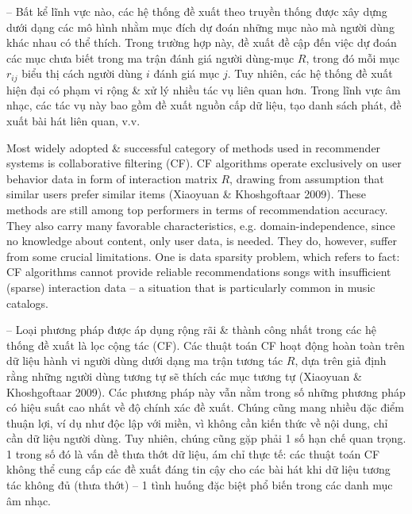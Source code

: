 \documentclass{article}
\begin{document}
\begin{itemize}
    -- Bất kể lĩnh vực nào, các hệ thống đề xuất theo truyền thống được xây dựng dưới dạng các mô hình nhằm mục đích dự đoán những mục nào mà người dùng khác nhau có thể thích. Trong trường hợp này, đề xuất đề cập đến việc dự đoán các mục chưa biết trong ma trận đánh giá người dùng-mục $R$, trong đó mỗi mục $r_{ij}$ biểu thị cách người dùng $i$ đánh giá mục $j$. Tuy nhiên, các hệ thống đề xuất hiện đại có phạm vi rộng \& xử lý nhiều tác vụ liên quan hơn. Trong lĩnh vực âm nhạc, các tác vụ này bao gồm đề xuất nguồn cấp dữ liệu, tạo danh sách phát, đề xuất bài hát liên quan, v.v.

    Most widely adopted \& successful category of methods used in recommender systems is collaborative filtering (CF). CF algorithms operate exclusively on user behavior data in form of interaction matrix $R$, drawing from assumption that similar users prefer similar items (Xiaoyuan \& Khoshgoftaar 2009). These methods are still among top performers in terms of recommendation accuracy. They also carry many favorable characteristics, e.g. domain-independence, since no knowledge about content, only user data, is needed. They do, however, suffer from some crucial limitations. One is data sparsity problem, which refers to fact: CF algorithms cannot provide reliable recommendations songs with insufficient (sparse) interaction data -- a situation that is particularly common in music catalogs.

    -- Loại phương pháp được áp dụng rộng rãi \& thành công nhất trong các hệ thống đề xuất là lọc cộng tác (CF). Các thuật toán CF hoạt động hoàn toàn trên dữ liệu hành vi người dùng dưới dạng ma trận tương tác $R$, dựa trên giả định rằng những người dùng tương tự sẽ thích các mục tương tự (Xiaoyuan \& Khoshgoftaar 2009). Các phương pháp này vẫn nằm trong số những phương pháp có hiệu suất cao nhất về độ chính xác đề xuất. Chúng cũng mang nhiều đặc điểm thuận lợi, ví dụ như độc lập với miền, vì không cần kiến thức về nội dung, chỉ cần dữ liệu người dùng. Tuy nhiên, chúng cũng gặp phải 1 số hạn chế quan trọng. 1 trong số đó là vấn đề thưa thớt dữ liệu, ám chỉ thực tế: các thuật toán CF không thể cung cấp các đề xuất đáng tin cậy cho các bài hát khi dữ liệu tương tác không đủ (thưa thớt) -- 1 tình huống đặc biệt phổ biến trong các danh mục âm nhạc.


\end{itemize}
\end{document}
